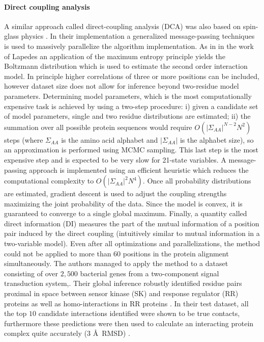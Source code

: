 \paragraph{Direct coupling analysis}
A similar approach called  direct-coupling analysis (DCA) was also based on spin-glass physics \cite{weigt2009identification}.
In their implementation a generalized message-passing techniques is used to massively parallelize the algorithm implementation.
As in in the work of Lapedes \cite{lapedes2012using} an application of the maximum entropy principle yields the Boltzmann distribution which is used to estimate the second order interaction model.
In principle higher correlations of three or more positions can be included, however dataset size does not allow for inference beyond two-residue model parameters. 
Determining model parameters, which is the most computationally expensive task is achieved by using a two-step procedure: 
i) given a candidate set of model parameters, single and two residue distributions are estimated; 
ii) the summation over all possible protein sequences would require $O(|\Sigma_{AA}|^{N-2} N^2)$ steps (where $\Sigma_{AA}$ is the amino acid alphabet and $|\Sigma_{AA}|$ is the alphabet size), so an approximation is performed using MCMC sampling. 
This last step is the most expensive step and is expected to be very slow for 21-state variables.
A message-passing approach is implemented using an efficient heuristic which reduces the computational complexity to $O(|\Sigma_{AA}|^2 N^4)$.
Once all probability distributions are estimated, gradient descent is used to adjust the coupling strengths maximizing the joint probability of the data.
Since the model is convex, it is guaranteed to converge to a single global maximum.
Finally, a quantity called direct information (DI) measures the part of the mutual information of a position pair induced by the direct coupling (intuitively similar to mutual information in a two-variable model).
Even after all optimizations and parallelizations, the method could not be applied to more than $60$ positions in the protein alignment simultaneously.
The authors managed to apply the method to a dataset consisting of over $2,500$ bacterial genes from a two-component signal transduction system,. Their global inference robustly identified residue pairs proximal in space between sensor kinase (SK) and response regulator (RR) proteins as well as homo-interactions in RR proteins \cite{weigt2009identification}.
In their test dataset, all the top $10$ candidate interactions identified were shown to be true contacts, furthermore these predictions were then used to calculate an interacting protein complex quite accurately (3 \AA\  RMSD) \cite{morcos2011direct}.

